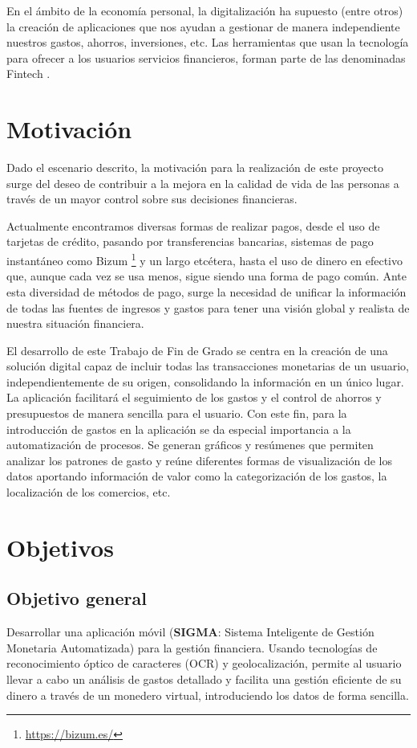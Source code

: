 En el ámbito de la economía personal, la digitalización ha supuesto (entre 
otros) la creación de aplicaciones que nos ayudan a gestionar de manera independiente nuestros 
gastos, ahorros, inversiones, etc. Las herramientas que usan la tecnología para ofrecer a los usuarios servicios financieros, forman parte de las denominadas Fintech \cite{schueffel2016taming}.

\section{Motivación}
Dado el escenario descrito, la motivación para la realización de este proyecto surge del deseo 
de contribuir a la mejora en la calidad de vida de las personas a través de un mayor control 
sobre sus decisiones financieras.

Actualmente encontramos diversas formas de realizar pagos, desde el uso de tarjetas de crédito,
pasando por transferencias bancarias, sistemas de pago instantáneo como Bizum \footnote{\url{https://bizum.es/}} y un largo etcétera, hasta el uso de dinero en efectivo que, aunque cada vez se usa menos, sigue siendo una forma de pago común. Ante esta diversidad de métodos de pago, surge la necesidad de  unificar la información de todas las fuentes de ingresos y gastos para tener una visión global y 
realista de nuestra situación financiera.

El desarrollo de este Trabajo de Fin de Grado se centra en la creación de una solución digital 
capaz de incluir todas las transacciones monetarias de un usuario, independientemente de su 
origen, consolidando la información en un único lugar. La aplicación facilitará el seguimiento de los gastos y el control de ahorros y presupuestos de manera sencilla para el usuario. Con este fin, para la introducción de gastos en la aplicación se da especial importancia a la automatización 
de procesos. Se generan gráficos y resúmenes que permiten analizar los
patrones de gasto y reúne diferentes formas de visualización de los datos aportando información 
de valor como la categorización de los gastos, la localización de los comercios, etc.\\

\section{Objetivos} \label{sect:goals}
\subsection{Objetivo general}
Desarrollar una aplicación móvil (\textbf{SIGMA}: Sistema Inteligente de Gestión Monetaria Automatizada) 
para la gestión financiera. Usando tecnologías de reconocimiento
óptico de caracteres (OCR) y geolocalización, permite al usuario llevar a cabo un 
análisis de gastos detallado y facilita una gestión eficiente de su dinero
a través de un monedero virtual, introduciendo los datos de 
forma sencilla.

